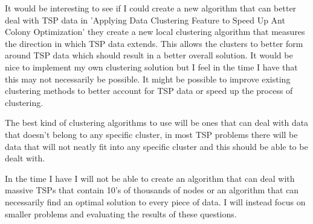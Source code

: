 It would be interesting to see if I could create a new algorithm that can better deal with TSP data in 'Applying Data Clustering Feature to Speed Up Ant Colony Optimization'\cite{pang_chao-yang_ben-qiong_zhang_jie_wei_shan_zheng-chao_2014} they create a new local clustering algorithm that measures the direction in which TSP data extends. This allows the clusters to better form around TSP data which should result in a better overall solution. It would be nice to implement my own clustering solution but I feel in the time I have that this may not necessarily be possible. It might be possible to improve existing clustering methods to better account for TSP data or speed up the process of clustering. 

The best kind of clustering algorithms to use will be ones that can deal with data that doesn't belong to any specific cluster, in most TSP problems there will be data that will not neatly fit into any specific cluster and this should be able to be dealt with. 

In the time I have I will not be able to create an algorithm that can deal with massive TSPs that contain 10's of thousands of nodes or an algorithm that can necessarily find an optimal solution to every piece of data. I will instead focus on smaller problems and evaluating the results of these questions.